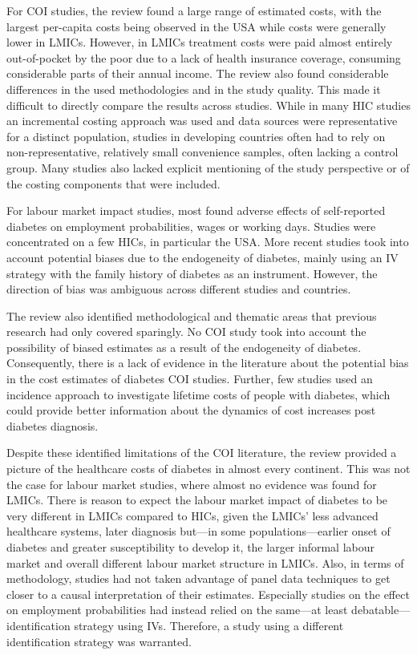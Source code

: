 For \ac{COI} studies, the review found a large range of estimated costs, with the largest per-capita costs being observed in the USA while costs were generally lower in \acp{LMIC}. However, in \acp{LMIC} treatment costs were paid almost entirely out-of-pocket by the poor due to a lack of health insurance coverage, consuming considerable parts of their annual income.  The review also found considerable differences in the used methodologies  and in the study quality. This made it difficult to directly compare the results across studies. While in many \ac{HIC} studies an incremental costing approach was used and data sources were representative for a distinct population, studies in developing countries often had to rely on non-representative, relatively small convenience samples, often lacking a control group. Many studies also lacked explicit mentioning of the study perspective or of the costing components that were included. 

For labour market impact studies, most found adverse effects of self-reported diabetes on employment probabilities, wages or working days. Studies were concentrated on a few \acp{HIC}, in particular the USA. More recent studies took into account potential biases due to the endogeneity of diabetes, mainly using an \ac{IV} strategy with the family history of diabetes as an instrument. However, the direction of bias was ambiguous across different studies and countries. 

The review also identified methodological and thematic areas that previous research had only covered sparingly. No \ac{COI} study took into account the possibility of biased estimates as a result of the endogeneity of diabetes. Consequently, there is a lack of evidence in the literature about the potential bias in the cost estimates of diabetes \ac{COI} studies. Further, few studies used an incidence approach to investigate lifetime costs of people with diabetes, which could provide better information about the dynamics of cost increases post diabetes diagnosis. 

Despite these identified limitations of the \ac{COI} literature, the review provided a picture of the healthcare costs of diabetes in almost every continent. This was not the case for labour market studies, where almost no evidence was found for \acp{LMIC}. There is reason to expect the labour market impact of diabetes to be very different in \acp{LMIC} compared to \acp{HIC}, given the \acp{LMIC}' less advanced healthcare systems, later diagnosis but---in some populations---earlier onset of diabetes and greater susceptibility to develop it, the larger informal labour market and overall different labour market structure in \acp{LMIC}. Also, in terms of methodology, studies had not taken advantage of panel data techniques to get closer to a causal interpretation of their estimates. Especially studies on the effect on employment probabilities had instead relied on the same---at least debatable---identification strategy using \acp{IV}. Therefore, a study using a different identification strategy was warranted.

